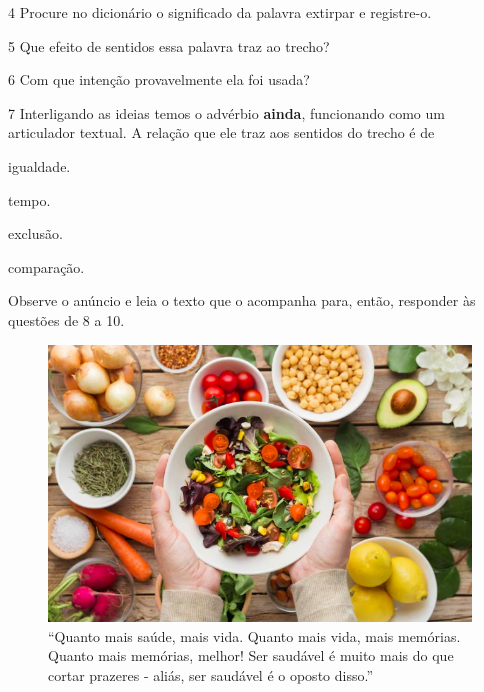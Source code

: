 \num{4} Procure no dicionário o significado da palavra extirpar e
registre-o. 


\num{5} Que efeito de sentidos essa palavra traz ao trecho? 


\num{6} Com que intenção provavelmente ela foi usada? 


\num{7} Interligando as ideias temos o advérbio \textbf{ainda},
funcionando como um articulador textual. A relação que ele traz aos
sentidos do trecho é de

\begin{boxlist}
 igualdade.

 tempo.

 exclusão.

 comparação.
\end{boxlist}

Observe o anúncio e leia o texto que o acompanha para, então, responder
às questões de 8 a 10.

\begin{figure}[htpb!]
\centering
\includegraphics[width=\textwidth]{./media/img7pt.png}
\caption{``Quanto mais saúde, mais vida. Quanto mais vida, mais memórias. Quanto
mais memórias, melhor! Ser saudável é muito mais do que cortar prazeres
- aliás, ser saudável é o oposto disso.''}
\end{figure}

